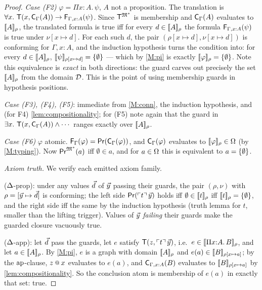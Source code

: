 \begin{proof}
\emph{Case (F2)} $\varphi = \Pi x{:}A.\,\psi$, $A$ not a
proposition.  The translation is $\forall x.\ \mathsf{T}(x,
\mathsf{C}_{\Gamma}(A)) \to \mathsf{F}_{\Gamma,x:A}(\psi)$.  Since
$\mathsf{T}^{\mathfrak{M}^{*}}$ is membership and $\mathsf{C}_{\Gamma}(A)$ evaluates
to $[\![ A ]\!]_{\rho}$, the translated formula is true iff for every
$d \in [\![ A ]\!]_{\rho}$ the formula $\mathsf{F}_{\Gamma,x:A}(\psi)$ is true
under $\nu[x \mapsto d]$.  For each such $d$, the pair
$(\rho[x \mapsto d], \nu[x \mapsto d])$ is conforming for
$\Gamma, x{:}A$, and the induction hypothesis turns the condition
into: for every $d \in [\![ A ]\!]_{\rho}$,
$[\![ \psi ]\!]_{\rho[x \mapsto d]} = \{\emptyset\}$ --- which by \ref{M:pi} is
exactly $[\![ \varphi ]\!]_{\rho} = \{\emptyset\}$.  Note this equivalence is
\emph{exact} in both directions: the guard carves out precisely the
set $[\![ A ]\!]_{\rho}$ from the domain $\mathcal{D}$.  This is the point of
using membership guards in hypothesis positions.

\emph{Case (F3), (F4), (F5)}: immediate from \ref{M:conn}, the
induction hypothesis, and (for F4) \cref{lem:compositionality};
for (F5) note again that the guard in $\exists x.\ \hastype(x,
\trC{\Gamma}{A}) \wedge \cdots$ ranges exactly over
$[\![ A ]\!]_{\rho}$.

\emph{Case (F6)} $\varphi$ atomic.  $\mathsf{F}_{\Gamma}(\varphi) =
\mathsf{Pr}(\mathsf{C}_{\Gamma}(\varphi))$, and $\mathsf{C}_{\Gamma}(\varphi)$ evaluates
to $[\![ \varphi ]\!]_{\rho} \in \Omega$ (by \ref{M:typing}).  Now
$\mathsf{Pr}^{\mathfrak{M}^{*}}(a)$ iff $\emptyset \in a$, and for $a \in \Omega$ this
is equivalent to $a = \{\emptyset\}$.

\emph{Axiom truth.}  We verify each emitted axiom family.

($\Delta$-prop): under any values $\vec{d}$ of $\vec{y}$ passing their
guards, the pair $(\rho, \nu)$ with $\rho = [\vec{y} \mapsto
\vec{d}]$ is conforming; the left side $\mathsf{Pr}(\ulcorner t \urcorner\,\vec{y})$
holds iff $\emptyset \in [\![ t ]\!]_{\rho}$ iff $[\![ t ]\!]_{\rho} =
\{\emptyset\}$, and the right side iff the same by the induction
hypothesis (truth lemma for $t$, smaller than the lifting trigger).
Values of $\vec{y}$ \emph{failing} their guards make the guarded
closure vacuously true.

($\Delta$-app): let $\vec{d}$ pass the guards, let $e$ satisfy
$\mathsf{T}(z, \ulcorner t \urcorner\,\vec{y})$, i.e.\ $e \in [\![ \Pi
x{:}A.\,B ]\!]_{\rho}$, and let $a \in [\![ A ]\!]_{\rho}$.  By \ref{M:pi},
$e$ is a graph with domain $[\![ A ]\!]_{\rho}$ and $e(a) \in
[\![ B ]\!]_{\rho[x \mapsto a]}$; by the $\mathrm{ap}$-clause, $z \app x$
evaluates to $e(a)$, and $\mathsf{C}_{\Gamma,x:A}(B)$ evaluates to
$[\![ B ]\!]_{\rho[x\mapsto a]}$ by \cref{lem:compositionality}.  So the
conclusion atom is membership of $e(a)$ in exactly that set: true.


\end{proof}
